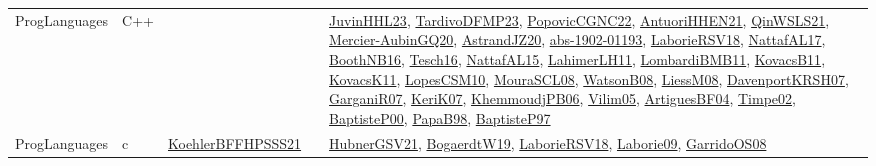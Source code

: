{\begin{longtable}{llp{6cm}p{6cm}p{6cm}}
ProgLanguages &  C++  &  &  & \href{papers/JuvinHHL23.pdf}{JuvinHHL23}\cite{JuvinHHL23}, \href{papers/TardivoDFMP23.pdf}{TardivoDFMP23}\cite{TardivoDFMP23}, \href{papers/PopovicCGNC22.pdf}{PopovicCGNC22}\cite{PopovicCGNC22}, \href{papers/AntuoriHHEN21.pdf}{AntuoriHHEN21}\cite{AntuoriHHEN21}, \href{articles/QinWSLS21.pdf}{QinWSLS21}\cite{QinWSLS21}, \href{papers/Mercier-AubinGQ20.pdf}{Mercier-AubinGQ20}\cite{Mercier-AubinGQ20}, \href{articles/AstrandJZ20.pdf}{AstrandJZ20}\cite{AstrandJZ20}, \href{articles/abs-1902-01193.pdf}{abs-1902-01193}\cite{abs-1902-01193}, \href{articles/LaborieRSV18.pdf}{LaborieRSV18}\cite{LaborieRSV18}, \href{articles/NattafAL17.pdf}{NattafAL17}\cite{NattafAL17}, \href{papers/BoothNB16.pdf}{BoothNB16}\cite{BoothNB16}, \href{papers/Tesch16.pdf}{Tesch16}\cite{Tesch16}, \href{articles/NattafAL15.pdf}{NattafAL15}\cite{NattafAL15}, \href{papers/LahimerLH11.pdf}{LahimerLH11}\cite{LahimerLH11}, \href{papers/LombardiBMB11.pdf}{LombardiBMB11}\cite{LombardiBMB11}, \href{articles/KovacsB11.pdf}{KovacsB11}\cite{KovacsB11}, \href{articles/KovacsK11.pdf}{KovacsK11}\cite{KovacsK11}, \href{articles/LopesCSM10.pdf}{LopesCSM10}\cite{LopesCSM10}, \href{papers/MouraSCL08.pdf}{MouraSCL08}\cite{MouraSCL08}, \href{papers/WatsonB08.pdf}{WatsonB08}\cite{WatsonB08}, \href{articles/LiessM08.pdf}{LiessM08}\cite{LiessM08}, \href{papers/DavenportKRSH07.pdf}{DavenportKRSH07}\cite{DavenportKRSH07}, \href{papers/GarganiR07.pdf}{GarganiR07}\cite{GarganiR07}, \href{papers/KeriK07.pdf}{KeriK07}\cite{KeriK07}, \href{papers/KhemmoudjPB06.pdf}{KhemmoudjPB06}\cite{KhemmoudjPB06}, \href{papers/Vilim05.pdf}{Vilim05}\cite{Vilim05}, \href{papers/ArtiguesBF04.pdf}{ArtiguesBF04}\cite{ArtiguesBF04}, \href{articles/Timpe02.pdf}{Timpe02}\cite{Timpe02}, \href{articles/BaptisteP00.pdf}{BaptisteP00}\cite{BaptisteP00}, \href{articles/PapaB98.pdf}{PapaB98}\cite{PapaB98}, \href{papers/BaptisteP97.pdf}{BaptisteP97}\cite{BaptisteP97}\\
ProgLanguages & c  & \href{articles/KoehlerBFFHPSSS21.pdf}{KoehlerBFFHPSSS21}\cite{KoehlerBFFHPSSS21} &  & \href{articles/HubnerGSV21.pdf}{HubnerGSV21}\cite{HubnerGSV21}, \href{papers/BogaerdtW19.pdf}{BogaerdtW19}\cite{BogaerdtW19}, \href{articles/LaborieRSV18.pdf}{LaborieRSV18}\cite{LaborieRSV18}, \href{papers/Laborie09.pdf}{Laborie09}\cite{Laborie09}, \href{articles/GarridoOS08.pdf}{GarridoOS08}\cite{GarridoOS08}\\

\end{longtable}}
